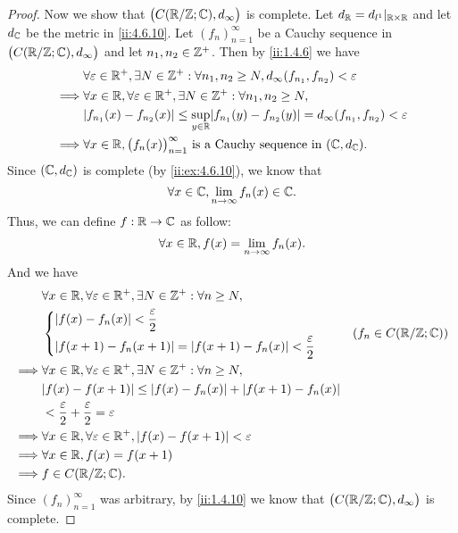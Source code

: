\begin{proof}
  Now we show that \(\big(C(\mathbb{R} / \mathbb{Z} ; \mathbb{C}), d_\infty\big)\) is complete.
  Let \(d_{\mathbb{R}} = d_{l^1}|_{\mathbb{R} \times \mathbb{R}}\) and let \(d_{\mathbb{C}}\) be the metric in \cref{ii:4.6.10}.
  Let \((f_n)_{n = 1}^\infty\) be a Cauchy sequence in \(\big(C(\mathbb{R} / \mathbb{Z} ; \mathbb{C}), d_\infty\big)\) and let \(n_1, n_2 \in \mathbb{Z}^+\).
  Then by \cref{ii:1.4.6} we have
  \begin{align*}
             & \forall \varepsilon \in \R^+, \exists N \in \Z^+ : \forall n_1, n_2 \geq N, d_\infty(f_{n_1}, f_{n_2}) < \varepsilon        \\
    \implies & \forall x \in \R, \forall \varepsilon \in \R^+, \exists N \in \Z^+ : \forall n_1, n_2 \geq N,                               \\
             & \abs{f_{n_1}(x) - f_{n_2}(x)} \leq \sup_{y \in \R} \abs{f_{n_1}(y) - f_{n_2}(y)} = d_\infty(f_{n_1}, f_{n_2}) < \varepsilon \\
    \implies & \forall x \in \R, \big(f_n(x)\big)_{n = 1}^\infty \text{ is a Cauchy sequence in } (\C, d_{\C}).
  \end{align*}
  Since \((\mathbb{C}, d_{\mathbb{C}})\) is complete (by \cref{ii:ex:4.6.10}), we know that
  \[
    \forall x \in \mathbb{C}, \lim_{n \to \infty} f_n(x) \in \mathbb{C}.
  \]
  Thus, we can define \(f : \mathbb{R} \to \mathbb{C}\) as follow:
  \[
    \forall x \in \mathbb{R}, f(x) = \lim_{n \to \infty} f_n(x).
  \]
  And we have
  \begin{align*}
             & \forall x \in \R, \forall \varepsilon \in \R^+, \exists N \in \Z^+ : \forall n \geq N, \\
             & \begin{dcases}
                 \abs{f(x) - f_n(x)} < \dfrac{\varepsilon}{2} \\
                 \abs{f(x + 1) - f_n(x + 1)} = \abs{f(x + 1) - f_n(x)} < \dfrac{\varepsilon}{2}
               \end{dcases}         & (f_n \in C(\R / \Z ; \C))          \\
    \implies & \forall x \in \R, \forall \varepsilon \in \R^+, \exists N \in \Z^+ : \forall n \geq N, \\
             & \abs{f(x) - f(x + 1)} \leq \abs{f(x) - f_n(x)} + \abs{f(x + 1) - f_n(x)}               \\
             & < \dfrac{\varepsilon}{2} + \dfrac{\varepsilon}{2} = \varepsilon                        \\
    \implies & \forall x \in \R, \forall \varepsilon \in \R^+, \abs{f(x) - f(x + 1)} < \varepsilon    \\
    \implies & \forall x \in \R, f(x) = f(x + 1)                                                      \\
    \implies & f \in C(\R / \Z ; \C).
  \end{align*}
  Since \((f_n)_{n = 1}^\infty\) was arbitrary, by \cref{ii:1.4.10} we know that \(\big(C(\mathbb{R} / \mathbb{Z} ; \mathbb{C}), d_\infty\big)\) is complete.
\end{proof}
